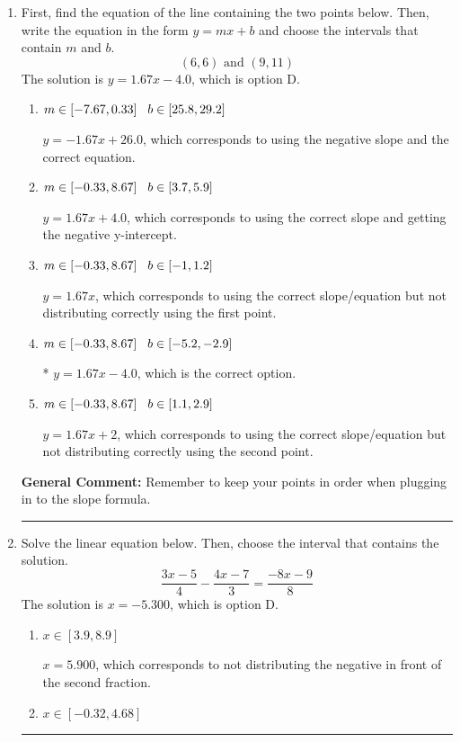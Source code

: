 \documentclass{extbook}[14pt]
\newcommand{\litem}[1]{\item #1

\rule{\textwidth}{0.4pt}}
\begin{document}
\begin{enumerate}\litem{
First, find the equation of the line containing the two points below. Then, write the equation in the form $ y=mx+b $ and choose the intervals that contain $m$ and $b$.
\[ (6, 6) \text{ and } (9, 11) \]The solution is \( y = 1.67x -4.0 \), which is option D.\begin{enumerate}[label=\Alph*.]
\item \( m \in [-7.67, 0.33] \hspace*{3mm} b \in [25.8, 29.2] \)

 $y = -1.67x + 26.0$, which corresponds to using the negative slope and the correct equation.
\item \( m \in [-0.33, 8.67] \hspace*{3mm} b \in [3.7, 5.9] \)

 $y = 1.67x + 4.0$, which corresponds to using the correct slope and getting the negative y-intercept.
\item \( m \in [-0.33, 8.67] \hspace*{3mm} b \in [-1, 1.2] \)

 $y = 1.67x$, which corresponds to using the correct slope/equation but not distributing correctly using the first point.
\item \( m \in [-0.33, 8.67] \hspace*{3mm} b \in [-5.2, -2.9] \)

* $y = 1.67x -4.0$, which is the correct option.
\item \( m \in [-0.33, 8.67] \hspace*{3mm} b \in [1.1, 2.9] \)

 $y = 1.67x + 2$, which corresponds to using the correct slope/equation but not distributing correctly using the second point.
\end{enumerate}

\textbf{General Comment:} Remember to keep your points in order when plugging in to the slope formula.
}
\litem{
Solve the linear equation below. Then, choose the interval that contains the solution.
\[ \frac{3x -5}{4} - \frac{4x -7}{3} = \frac{-8x -9}{8} \]The solution is \( x = -5.300 \), which is option D.\begin{enumerate}[label=\Alph*.]
\item \( x \in [3.9, 8.9] \)

 $x = 5.900$, which corresponds to not distributing the negative in front of the second fraction.
\item \( x \in [-0.32, 4.68] \)


\end{enumerate}}
\end{enumerate}
\end{document}

